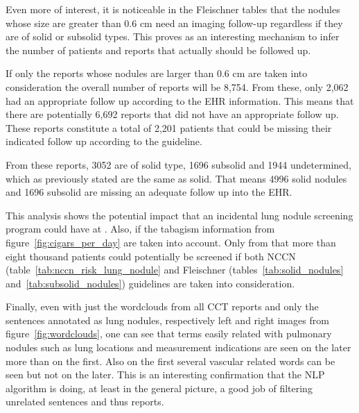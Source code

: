 Even more of interest, it is noticeable in the Fleischner tables that the nodules whose size are greater than 0.6 cm need an imaging follow-up regardless if they are of solid or subsolid types. This proves as an interesting mechanism to infer the number of patients and reports that actually should be followed up. 

If only the reports whose nodules are larger than 0.6 cm are taken into consideration the overall number of reports will be 8,754. From these, only 2,062 had an appropriate follow up according to the EHR information. This means that there are potentially 6,692 reports that did not have an appropriate follow up. These reports constitute a total of 2,201 patients that could be missing their indicated follow up according to the guideline.

From these reports, 3052 are of solid type, 1696 subsolid and 1944 undetermined, which as previously stated are the same as solid. That means 4996 solid nodules and 1696 subsolid are missing an adequate follow up into the \nomeHslShort{} EHR.

This analysis shows the potential impact that an incidental lung nodule screening program could have at \nomeHsl{}. Also, if the tabagism information from figure~\ref{fig:cigars_per_day} are taken into account. Only from that more than eight thousand patients could potentially be screened if both NCCN (table~\ref{tab:nccn_risk_lung_nodule} and Fleischner (tables~\ref{tab:solid_nodules} and~\ref{tab:subsolid_nodules}) guidelines are taken into consideration.

Finally, even with just the wordclouds from all CCT reports and only the sentences annotated as lung nodules, respectively left and right images from figure~\ref{fig:wordclouds}, one can see that terms easily related with pulmonary nodules such as lung locations and measurement indications are seen on the later more than on the first. Also on the first several vascular related words can be seen but not on the later. This is an interesting confirmation that the NLP algorithm is doing, at least in the general picture, a good job of filtering unrelated sentences and thus reports.
